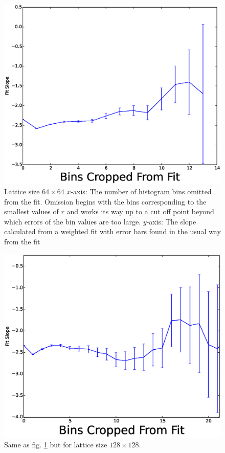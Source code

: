 \documentclass[aps,floatfix,11pt]{revtex4-1}
\begin{document}
\begin{figure}[h]
    \centering
    \includegraphics[width=8.5 cm]{multi_slps_dm_dm_64x64}
    \caption{Lattice size $64\times 64$ $x$-axis: The number of histogram bins omitted from the fit. Omission begins with the
        bins corresponding to the smallest values of $r$ and works its way up to a cut off point
    beyond which errors of the bin values are too large. $y$-axis: The slope calculated from a
    weighted fit with error bars found in the usual way from the fit\label{fig:mult_slps_dm_dm_64x64}}
\end{figure}

\begin{figure}[h]
    \centering
    \includegraphics[width=8.5 cm]{multi_slps_dm_dm_128x128}
    \caption{Same as fig. \ref{fig:mult_slps_dm_dm_64x64} but for lattice size $128 \times 128$. \label{fig:mult_slps_dm_dm_128x128}}
\end{figure}
\end{document}
